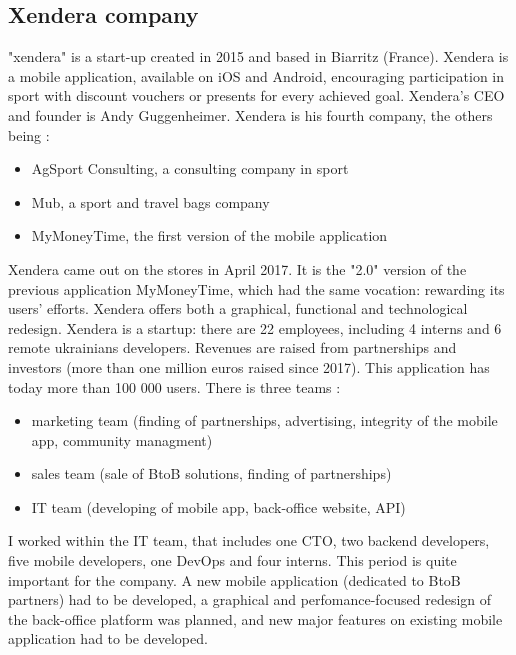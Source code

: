 \documentclass{article}
\begin{document}
            \subsection{Xendera company}
                "xendera" is a start-up created in 2015 and based in Biarritz (France). Xendera
                is a mobile application, available on iOS and Android, encouraging participation in sport
                with discount vouchers or presents for every achieved goal.
                \newline
                Xendera's CEO and founder is Andy Guggenheimer. Xendera is his fourth company, the
                others being :
                \begin{itemize}
                    \item{AgSport Consulting, a consulting company in sport}
                    \item{Mub, a sport and travel bags company}
                    \item{MyMoneyTime, the first version of the mobile application}
                \end{itemize}
                Xendera came out on the stores in April 2017. It is the "2.0" version of the previous
                application MyMoneyTime, which had the same vocation: rewarding its users' efforts.
                Xendera offers both a graphical, functional and technological redesign.
                \newline
                Xendera is a startup: there are 22 employees, including 4 interns and 6 remote ukrainians developers. Revenues are raised
                from partnerships and investors (more than one million euros raised since 2017).
                This application has today more than 100 000 users.
                \newline
                There is three teams :
                \begin{itemize}
                    \item{marketing team (finding of partnerships, advertising, integrity of the mobile app, community managment)}
                    \item{sales team (sale of BtoB solutions, finding of partnerships)}
                    \item{IT team (developing of mobile app, back-office website, API)}
                \end{itemize}
                I worked within the IT team, that includes one CTO, two backend developers, five mobile developers,
                one DevOps and four interns.
                \newline
                This period is quite important for the company. A new mobile application (dedicated to BtoB partners)
                had to be developed, a graphical and perfomance-focused redesign of the back-office platform was planned,
                and new major features on existing mobile application had to be developed.
                
\end{document}
